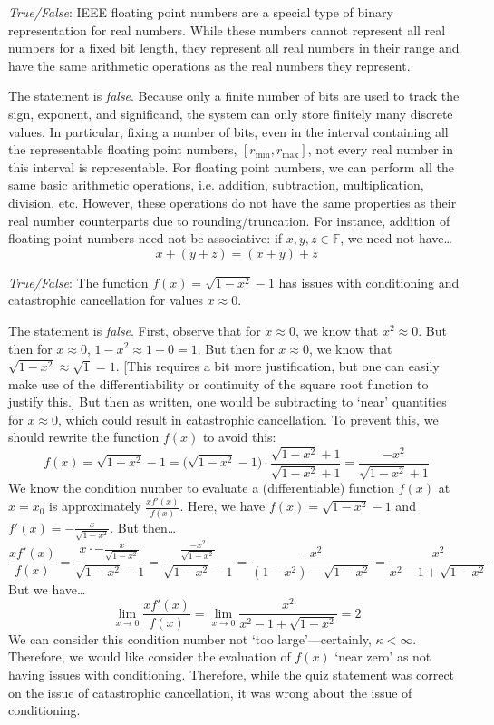 \documentclass[11pt,letterpaper]{article}
\begin{document}
\quizsol \textit{True/False}: IEEE floating point numbers are a special type of binary representation for real numbers. While these numbers cannot represent all real numbers for a fixed bit length, they represent all real numbers in their range and have the same arithmetic operations as the real numbers they represent. \pspace

\sol The statement is \textit{false}. Because only a finite number of bits are used to track the sign, exponent, and significand, the system can only store finitely many discrete values. In particular, fixing a number of bits, even in the interval containing all the representable floating point numbers, $[r_{\text{min}}, r_{\text{max}}]$, not every real number in this interval is representable. For floating point numbers, we can perform all the same basic arithmetic operations, i.e. addition, subtraction, multiplication, division, etc. However, these operations do not have the same properties as their real number counterparts due to rounding/truncation. For instance, addition of floating point numbers need not be associative: if $x, y, z \in \mathbb{F}$, we need not have\dots
	\[
	x + (y + z)= (x + y) + z
	\] \pvspace{1.3cm}



\quizsol \textit{True/False}: The function $f(x)= \sqrt{1 - x^2} - 1$ has issues with conditioning and catastrophic cancellation for values $x \approx 0$. \pspace

\sol The statement is \textit{false}. First, observe that for $x \approx 0$, we know that $x^2 \approx 0$. But then for $x \approx 0$, $1 - x^2 \approx 1 - 0= 1$. But then for $x \approx 0$, we know that $\sqrt{1 - x^2} \approx \sqrt{1}= 1$. [This requires a bit more justification, but one can easily make use of the differentiability or continuity of the square root function to justify this.] But then as written, one would be subtracting to `near' quantities for $x \approx 0$, which could result in catastrophic cancellation. To prevent this, we should rewrite the function $f(x)$ to avoid this:
	\[
	f(x)= \sqrt{1 - x^2} - 1= \big( \sqrt{1 - x^2} - 1 \big) \cdot \dfrac{\sqrt{1 - x^2} + 1}{\sqrt{1 - x^2} + 1}= \dfrac{-x^2}{\sqrt{1 - x^2} + 1}
	\]
We know the condition number to evaluate a (differentiable) function $f(x)$ at $x= x_0$ is approximately $\frac{x f'(x)}{f(x)}$. Here, we have $f(x)= \sqrt{1 - x^2} - 1$ and $f'(x)= -\frac{x}{\sqrt{1 - x^2}}$. But then\dots
	\[
	\dfrac{x f'(x)}{f(x)}= \dfrac{x \cdot -\frac{x}{\sqrt{1 - x^2}}}{\sqrt{1 - x^2} - 1}= \dfrac{\frac{-x^2}{\sqrt{1 - x^2}}}{\sqrt{1 - x^2} - 1}= \dfrac{-x^2}{(1 - x^2) - \sqrt{1 - x^2}}= \dfrac{x^2}{x^2 - 1 + \sqrt{1 - x^2}}
	\]
But we have\dots
	\[
	\lim_{x \to 0} \dfrac{x f'(x)}{f(x)}= \lim_{x \to 0} \dfrac{x^2}{x^2 - 1 + \sqrt{1 - x^2}}= 2
	\]
We can consider this condition number not `too large'---certainly, $\kappa < \infty$. Therefore, we would like consider the evaluation of $f(x)$ `near zero' as not having issues with conditioning. Therefore, while the quiz statement was correct on the issue of catastrophic cancellation, it was wrong about the issue of conditioning. \pvspace{1.3cm}
\end{document}

